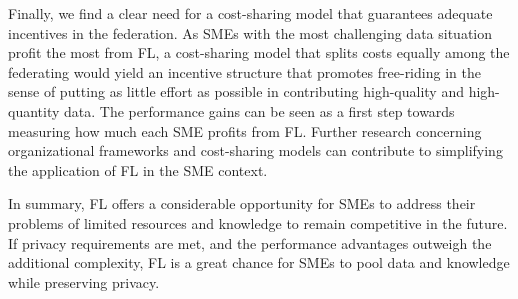 Finally, we find a clear need for a cost-sharing model that guarantees adequate incentives in the federation. As SMEs with the most challenging data situation profit the most from FL, a cost-sharing model that splits costs equally among the federating would yield an incentive structure that promotes free-riding in the sense of putting as little effort as possible in contributing high-quality and high-quantity data. The performance gains can be seen as a first step towards measuring how much each SME profits from FL. Further research concerning organizational frameworks and cost-sharing models can contribute to simplifying the application of FL in the SME context.

In summary, FL offers a considerable opportunity for SMEs to address their problems of limited resources and knowledge to remain competitive in the future. If privacy requirements are met, and the performance advantages outweigh the additional complexity, FL is a great chance for SMEs to pool data and knowledge while preserving privacy.
